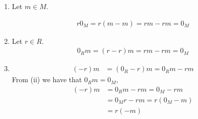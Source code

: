 \documentclass[Notebook.tex]{subfiles}
\begin{document}
    \begin{solution}
        \bbni
        \begin{enumerate}
            \item Let $m \in M$. 
            
            \begin{align*}
                r0_M = r(m-m) = rm - rm = 0_M
            \end{align*}

            \item Let $r \in R$. 
            \begin{align*}
                0_Rm = (r-r)m = rm - rm = 0_M
            \end{align*}
            
            \item \begin{align*}
                (-r)m &= (0_R -r) m = 0_Rm - rm 
            \end{align*}
            From (ii) we have that $0_Rm = 0_M$, 
            \begin{align*}
                (-r)m &= 0_Rm - rm = 0_M - rm \\ 
                &= 0_Mr - rm = r(0_M -m) \\ 
                &= r(-m)
            \end{align*}
        \end{enumerate}
    \end{solution}
	
    \newpage 

\end{document}

